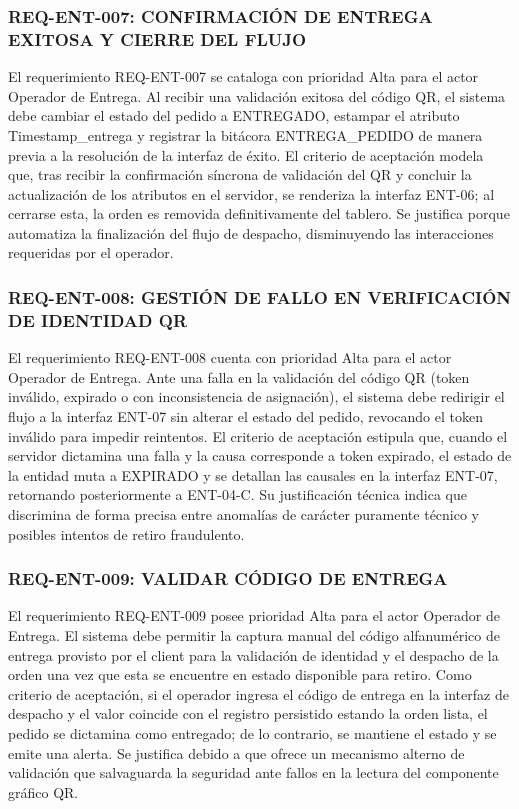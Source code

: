 \subsubsection{REQ-ENT-007: CONFIRMACIÓN DE ENTREGA EXITOSA Y CIERRE DEL FLUJO}
El requerimiento REQ-ENT-007 se cataloga con prioridad Alta para el actor Operador de Entrega. Al recibir una validación exitosa del código QR, el sistema debe cambiar el estado del pedido a ENTREGADO, estampar el atributo Timestamp\_entrega y registrar la bitácora ENTREGA\_PEDIDO de manera previa a la resolución de la interfaz de éxito. El criterio de aceptación modela que, tras recibir la confirmación síncrona de validación del QR y concluir la actualización de los atributos en el servidor, se renderiza la interfaz ENT-06; al cerrarse esta, la orden es removida definitivamente del tablero. Se justifica porque automatiza la finalización del flujo de despacho, disminuyendo las interacciones requeridas por el operador.

\subsubsection{REQ-ENT-008: GESTIÓN DE FALLO EN VERIFICACIÓN DE IDENTIDAD QR}
El requerimiento REQ-ENT-008 cuenta con prioridad Alta para el actor Operador de Entrega. Ante una falla en la validación del código QR (token inválido, expirado o con inconsistencia de asignación), el sistema debe redirigir el flujo a la interfaz ENT-07 sin alterar el estado del pedido, revocando el token inválido para impedir reintentos. El criterio de aceptación estipula que, cuando el servidor dictamina una falla y la causa corresponde a token expirado, el estado de la entidad muta a EXPIRADO y se detallan las causales en la interfaz ENT-07, retornando posteriormente a ENT-04-C. Su justificación técnica indica que discrimina de forma precisa entre anomalías de carácter puramente técnico y posibles intentos de retiro fraudulento.

\subsubsection{REQ-ENT-009: VALIDAR CÓDIGO DE ENTREGA}
El requerimiento REQ-ENT-009 posee prioridad Alta para el actor Operador de Entrega. El sistema debe permitir la captura manual del código alfanumérico de entrega provisto por el client para la validación de identidad y el despacho de la orden una vez que esta se encuentre en estado disponible para retiro. Como criterio de aceptación, si el operador ingresa el código de entrega en la interfaz de despacho y el valor coincide con el registro persistido estando la orden lista, el pedido se dictamina como entregado; de lo contrario, se mantiene el estado y se emite una alerta. Se justifica debido a que ofrece un mecanismo alterno de validación que salvaguarda la seguridad ante fallos en la lectura del componente gráfico QR.


